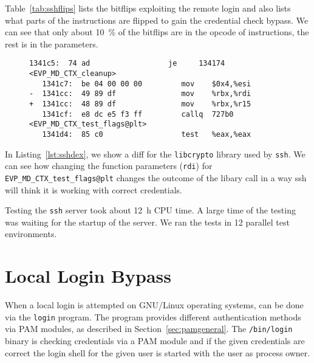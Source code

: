 Table~\ref{tab:sshflips} lists the bitflips exploiting the remote login and also
lists what parts of the instructions are flipped to gain the credential check
bypass. We can see that only about \SI{10}{\percent} of the bitflips are in the
opcode of instructions, the rest is in the parameters.

\begin{figure}
\begin{minipage}{\linewidth}
\begin{lstlisting}[style=diff,
                   caption={Diff for a bitflip applied to the
\texttt{libcrypto.so.1.0.2} binary in order to bypass a credential check. The
move from \texttt{rbx} to \texttt{rdi} is exchanged with a move to
\texttt{r15}, this changes the parameter for \texttt{EVP\_MD\_CTX\_test\_flags},
which is highly likely to result in a different outcome.},
label=lst:sshdex]
   1341c5:  74 ad                  je     134174 <EVP_MD_CTX_cleanup>
   1341c7:  be 04 00 00 00         mov    $0x4,%esi
-  1341cc:  49 89 df               mov    %rbx,%rdi
+  1341cc:  48 89 df               mov    %rbx,%r15
   1341cf:  e8 dc e5 f3 ff         callq  727b0 <EVP_MD_CTX_test_flags@plt>
   1341d4:  85 c0                  test   %eax,%eax
\end{lstlisting}
\end{minipage}
\end{figure}

In Listing~\ref{lst:sshdex}, we show a diff for the \texttt{libcrypto} library
used by \texttt{ssh}. We can see how changing the function parameters
(\texttt{rdi}) for \texttt{EVP\_MD\_CTX\_test\_flags@plt} changes the outcome of
the libary call in a way ssh will think it is working with correct credentials.

Testing the \texttt{ssh} server took about \SI{12}{\hour} CPU time. A large time
of the testing was waiting for the startup of the server.  We ran the tests in
\num{12} parallel test environments.

\section{Local Login Bypass}

When a local login is attempted on GNU/Linux operating systems, can be done
via the \texttt{login} program. The program provides different authentication
methods via PAM modules, as described in Section~\ref{sec:pamgeneral}. The
\texttt{/bin/login} binary is checking credentials via a PAM module and if the
given credentials are correct the login shell for the given user is started
with the user as process owner.

